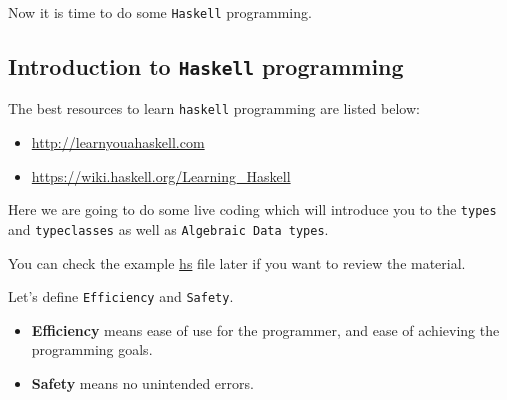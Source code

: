 \documentclass[11pt]{article}
\begin{document}
Now it is time to do some \texttt{Haskell} programming.

\subsection{Introduction to \texttt{Haskell} programming}
\label{sec:org39a8242}

The best resources to learn \texttt{haskell} programming are listed below:
\begin{itemize}
\item \url{http://learnyouahaskell.com}
\item \url{https://wiki.haskell.org/Learning\_Haskell}
\end{itemize}

Here we are going to do some live coding which will introduce you to the \texttt{types}
and \texttt{typeclasses} as well as \texttt{Algebraic Data types}.

You can check the example \href{./sample.hs}{hs} file later if you want to review the material.

Let's define \texttt{Efficiency} and \texttt{Safety}.

\begin{itemize}
\item \textbf{Efficiency} means ease of use for the programmer, and ease of achieving the
programming goals.
\item \textbf{Safety} means no unintended errors.
\end{itemize}
\end{document}
